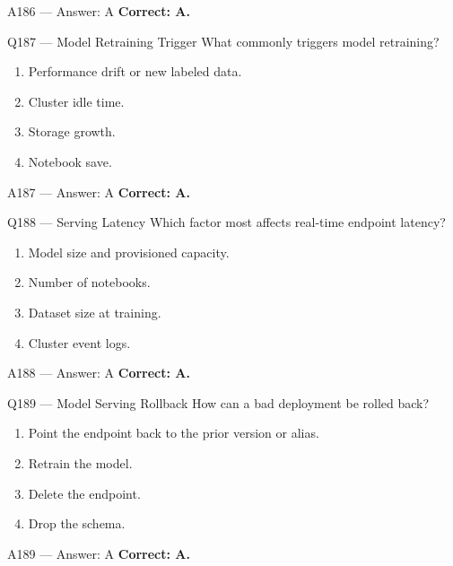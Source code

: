 \documentclass[aspectratio=169,9pt]{beamer}
\begin{document}
	\begin{frame}{A186 --- Answer: A}
		\textbf{Correct: A.}
	\end{frame}
	
	\begin{frame}{Q187 --- Model Retraining Trigger}
		What commonly triggers model retraining?
		\begin{enumerate}[label=\Alph*.]
			\item Performance drift or new labeled data.
			\item Cluster idle time.
			\item Storage growth.
			\item Notebook save.
		\end{enumerate}
	\end{frame}
	
	\begin{frame}{A187 --- Answer: A}
		\textbf{Correct: A.}
	\end{frame}
	
	\begin{frame}{Q188 --- Serving Latency}
		Which factor most affects real-time endpoint latency?
		\begin{enumerate}[label=\Alph*.]
			\item Model size and provisioned capacity.
			\item Number of notebooks.
			\item Dataset size at training.
			\item Cluster event logs.
		\end{enumerate}
	\end{frame}
	
	\begin{frame}{A188 --- Answer: A}
		\textbf{Correct: A.}
	\end{frame}
	
	\begin{frame}{Q189 --- Model Serving Rollback}
		How can a bad deployment be rolled back?
		\begin{enumerate}[label=\Alph*.]
			\item Point the endpoint back to the prior version or alias.
			\item Retrain the model.
			\item Delete the endpoint.
			\item Drop the schema.
		\end{enumerate}
	\end{frame}
	
	\begin{frame}{A189 --- Answer: A}
		\textbf{Correct: A.}
	\end{frame}
	
\end{document}
